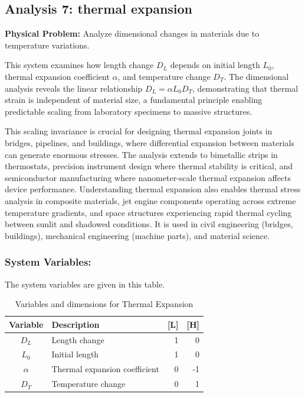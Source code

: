 \subsection{Analysis 7: thermal expansion}
\label{sec:Thermal_Expansion}

\begin{problembox}
\textbf{Physical Problem:} Analyze dimensional changes in materials due to temperature variations.
\end{problembox}
\begin{codebox}
This system examines how length change $D_L$ depends on initial length $L_0$, thermal expansion coefficient $\alpha$, and temperature change $D_T$. The dimensional analysis reveals the linear relationship $D_L = \alpha L_0 D_T$, demonstrating that thermal strain is independent of material size, a fundamental principle enabling predictable scaling from laboratory specimens to massive structures.

This scaling invariance is crucial for designing thermal expansion joints in bridges, pipelines, and buildings, where differential expansion between materials can generate enormous stresses. The analysis extends to bimetallic strips in thermostats, precision instrument design where thermal stability is critical, and semiconductor manufacturing where nanometer-scale thermal expansion affects device performance. Understanding thermal expansion also enables thermal stress analysis in composite materials, jet engine components operating across extreme temperature gradients, and space structures experiencing rapid thermal cycling between sunlit and shadowed conditions. It is used in civil engineering (bridges, buildings), mechanical engineering (machine parts), and material science.
\end{codebox}

\subsubsection*{System Variables: } The system variables are given in this table.

\begin{table}[htpb]
\centering
\begin{tabular}{|c|l|r|r|}
\hline
\textbf{Variable} & \textbf{Description} & \textbf{[L]} & \textbf{[H]} \\
\hline
$D_L$ & Length change & 1 & 0 \\
$L_0$ & Initial length & 1 & 0 \\
$\alpha$ & Thermal expansion coefficient & 0 & -1 \\
$D_T$ & Temperature change & 0 & 1 \\
\hline
\end{tabular}
\caption{Variables and dimensions for Thermal Expansion}
\end{table}

